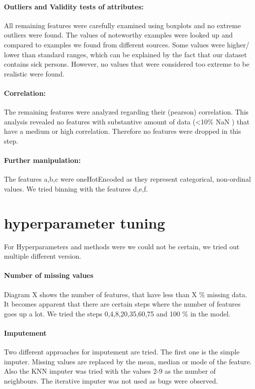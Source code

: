 \paragraph{Outliers and Validity tests of attributes:}
All remaining features were carefully examined using boxplots and no extreme outliers were found. The values of noteworthy examples were looked up and compared to examples we found from different sources. Some values were higher/ lower than standard ranges, which can be explained by the fact that our dataset contains sick persons. However, no values that were considered too extreme to be realistic were found. 

\paragraph{Correlation:}
The remaining features were analyzed regarding their (pearson) correlation. This analysis revealed no features with substantive amount of data (\textless 10\% NaN ) that have a medium or high correlation. Therefore no features were dropped in this step.

\paragraph{Further manipulation:}
The features a,b,c were oneHotEncoded as they represent categorical, non-ordinal values. We tried binning with the features d,e,f.

\section{hyperparameter tuning }
For Hyperparameters and methods were we could not be certain, we tried out multiple different version.

\paragraph{Number of missing values}
Diagram X shows the number of features, that have less than X \% missing data. It becomes apparent that there are certain steps where the number of features goes up a lot. We tried the steps 0,4,8,20,35,60,75 and 100 \% in the model.

\paragraph{Imputement}
Two different approaches for imputement are tried. The first one is the simple imputer. Missing values are replaced by the mean, median or mode of the feature. Also the KNN imputer was tried with the values 2-9 as the number of neighbours. The iterative imputer was not used as bugs were observed.

